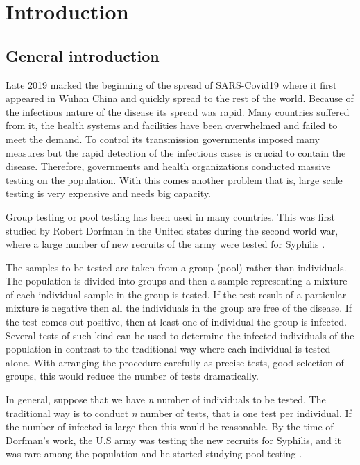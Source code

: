 \chapter{Introduction}
%






\section{General introduction}
Late 2019 marked the beginning of the spread of SARS-Covid19 where it first appeared in Wuhan China and quickly spread to the rest of the world. Because of the infectious nature of the disease its spread was rapid. Many countries suffered from it, the health systems and facilities have been overwhelmed and failed to meet the demand. To control its transmission governments imposed many measures but the rapid detection of the infectious cases is crucial to contain the disease. Therefore, governments and health organizations conducted massive testing on the population. With this comes another problem that is, large scale testing is very expensive and needs big capacity.  

Group  testing or pool testing has been used in many countries. This was first studied by Robert Dorfman in the United states during the second world war, where a large number of new recruits of the army were tested for Syphilis \cite{kubook}.

The samples to be tested are taken from a group (pool) rather than individuals. The population is divided into groups and then a sample representing a mixture of each individual sample in the group is tested. If the test result of a particular mixture is negative then all the individuals in the group are free of the disease. If the test comes out positive, then at least one of individual the group is infected. Several tests of such kind can be used to determine the infected individuals of the population in contrast to the traditional way where each individual is tested alone. With arranging the procedure carefully as precise tests, good selection of groups, this would reduce the number of tests dramatically.       

In general, suppose that we have \textit{n} number of individuals to be tested. The traditional way is to conduct \textit{n} number of tests, that is one test per individual. If the number of infected is large then this would be reasonable. By the time of Dorfman's work, the U.S army was testing the new recruits for Syphilis, and it was rare among the population and he started studying pool testing \cite{aldridge}.

